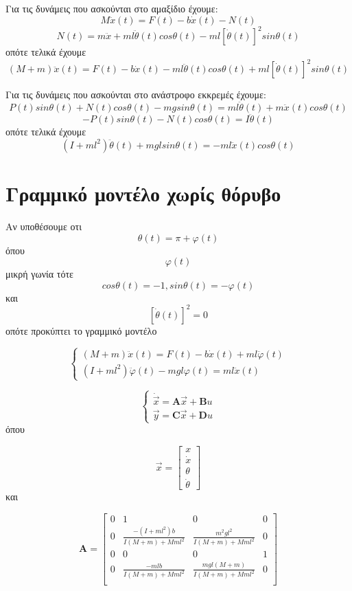 \documentclass[10pt]{article}
\begin{document}
Για τις δυνάμεις που ασκούνται στο αμαξίδιο έχουμε:
\[ Μ\ddot{x}(t) = F(t) - b\dot{x}(t) - N(t) \]
\[ N(t) = m\ddot{x} + ml\ddot{θ}(t)cosθ(t) - ml[\dot{θ}(t)]^2sinθ(t) \]
οπότε τελικά έχουμε
\[ (Μ+m)\ddot{x}(t) = F(t) - b\dot{x}(t) - ml\ddot{θ}(t)cosθ(t) + ml[\dot{θ}(t)]^2sinθ(t) \]

Για τις δυνάμεις που ασκούνται στο ανάστροφο εκκρεμές έχουμε:
\[ P(t)sinθ(t) + N(t)cosθ(t) - mgsinθ(t) = ml\ddot{θ}(t) + m\ddot{x}(t)cosθ(t) \]
\[ -P(t)sinθ(t) - N(t)cosθ(t) = I\ddot{θ}(t) \]
οπότε τελικά έχουμε
\[ (I+ml^2)\ddot{θ}(t) + mglsinθ(t) = - ml\ddot{x}(t)cosθ(t) \]




\section{Γραμμικό μοντέλο χωρίς θόρυβο}

Αν υποθέσουμε οτι $$ θ(t) = π + φ(t) $$ όπου $$φ(t)$$ μικρή γωνία τότε $$ cosθ(t)=-1, sinθ(t) = -φ(t) $$ και $$ [\dot{θ}(t)]^2=0 $$
οπότε προκύπτει το γραμμικό μοντέλο

\[
\begin{cases}
(Μ+m)\ddot{x}(t) = F(t) - b\dot{x}(t) + ml\ddot{φ}(t) \\
(I+ml^2)\ddot{φ}(t) - mglφ(t) = ml\ddot{x}(t)
\end{cases}
\]

\[
\begin{cases}
\dot{\vec{x}} = \mathbf{A}\vec{x} + \mathbf{B}u \\
\vec{y} = \mathbf{C}\vec{x} + \mathbf{D}u
\end{cases}
\]
όπου

\[
\vec{x} = 
\begin{bmatrix}
x \\ \dot{x} \\ θ \\ \dot{θ}
\end{bmatrix}
\] και

\[
\mathbf{A} =
\begin{bmatrix}
0 & 1 & 0 & 0 \\
0 & \frac{-(I+ml^2)b}{I(M+m)+Mml^2} & \frac{m^2gl^2}{I(M+m)+Mml^2} & 0 \\
0 & 0 & 0 & 1 \\
0 & \frac{-mlb}{I(M+m)+Mml^2} & \frac{mgl(M+m)}{I(M+m)+Mml^2} & 0 \\
\end{bmatrix}
\]
\end{document}
